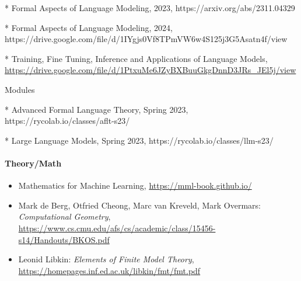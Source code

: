 * Formal Aspects of Language Modeling, 2023, https://arxiv.org/abs/2311.04329

* Formal Aspects of Language Modeling, 2024, https://drive.google.com/file/d/1IYgjs0Vf8TPmVW6w4S125j3G5Asatn4f/view

* Training, Fine Tuning, Inference and Applications of Language Models, 
\url{https://drive.google.com/file/d/1PtxuMe6JZyBXBuuGkgDnnD3JRs_JEl5j/view}

Modules

* Advanced Formal Language Theory, Spring 2023, https://rycolab.io/classes/aflt-s23/

* Large Language Models, Spring 2023, https://rycolab.io/classes/llm-s23/

\paragraph{Theory/Math}

\begin{itemize}
\item Mathematics for Machine Learning, \url{https://mml-book.github.io/}

\item Mark de Berg, Otfried Cheong, Marc van Kreveld, Mark Overmars: 
\textit{Computational Geometry},
\url{https://www.cs.cmu.edu/afs/cs/academic/class/15456-s14/Handouts/BKOS.pdf}

\item Leonid Libkin: 
\textit{Elements of Finite Model Theory},
\url{https://homepages.inf.ed.ac.uk/libkin/fmt/fmt.pdf}
\end{itemize}
